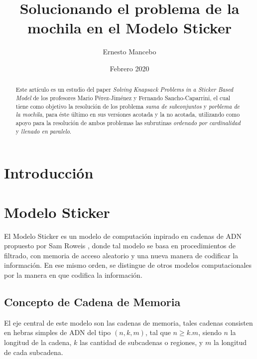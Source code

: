 \documentclass[12pt, letterpaper, twoside]{article}
\title{Solucionando el problema de la mochila en el Modelo Sticker}
\author{Ernesto Mancebo}
\date{Febrero 2020}
\begin{document}
    \maketitle
    \begin{abstract}
        Este artículo es un estudio del paper \emph{Solving Knapsack Problems in a Sticker Based Model} de los profesores Mario P{\'e}rez-Jim{\'e}nez y Fernando Sancho-Caparrini\autocite{ref10.1007/3-540-48017-X_15}, el cual tiene como objetivo la resolución de los problema \emph{suma de subconjuntos} y \emph{porblema de la mochila}, para éste último en sus versiones acotada y la no acotada, utilizando como apoyo para la resolución de ambos problemas las subrutinas \emph{ordenado por cardinalidad} y \emph{llenado en paralelo}.
    \end{abstract}

    \newpage
    \section{Introducción}

    \section{Modelo Sticker}
    El Modelo Sticker es un modelo de computación inpirado en cadenas de ADN propuesto por Sam Roweis \autocite{sticker_model}, donde tal modelo se basa en procedimientos de filtrado, con memoria de acceso aleatorio y una nueva manera de codificar la información. En ese mismo orden, se distingue de otros modelos computacionales por la manera en que codifica la información.

    \subsection{Concepto de Cadena de Memoria}
    El eje central de este modelo son las cadenas de memoria, tales cadenas consisten en hebras simples de ADN del tipo $(n, k, m)$, tal que $n\geq k.m$, siendo $n$ la longitud de la cadena, $k$ las cantidad de subcadenas o regiones, y $m$ la longitud de cada subcadena.
\end{document}
